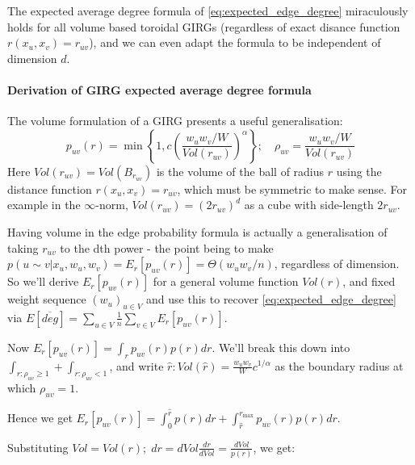 The expected average degree formula of \cref{eq:expected_edge_degree} miraculously holds for all volume based toroidal GIRGs (regardless of exact disance function $r(x_u, x_v) = r_{uv}$), and we can even adapt the formula to be independent of dimension $d$.

\paragraph{Derivation of GIRG expected average degree formula}
The volume formulation of a GIRG presents a useful generalisation:
\begin{equation}
    p_{uv}(r) = \min \left \{ 
        1,
        c \left (
            \frac{w_u w_v / W}{Vol(r_{uv})}
        \right )^\alpha    
    \right \}; \quad \rho_{uv} = \frac{w_u w_v / W}{Vol(r_{uv})}
\end{equation}
Here $Vol(r_{uv}) = Vol(B_{r_{uv}})$ is the volume of the ball of radius $r$ using the distance function $r(x_u, x_v) = r_{uv}$, which must be symmetric to make sense.
For example in the $\infty$-norm, $Vol(r_{uv}) = (2r_{uv})^d$ as a cube with side-length $2r_{uv}$.

Having volume in the edge probability formula is actually a generalisation of taking $r_{uv}$ to the dth power - the point being to make $p(u \sim v | x_u, w_u, w_v) = E_r[p_{uv}(r)] = \Theta(w_u w_v/n)$, regardless of dimension.
So we'll derive $E_r[p_{uv}(r)]$ for a general volume function $Vol(r)$, and fixed weight sequence $(w_u)_{u \in V}$ and use this to recover \cref{eq:expected_edge_degree} via $E[\overline{deg}] = \sum_{u \in V} \frac{1}{n} \sum_{v \in V} E_r[p_{uv}(r)]$.


Now $E_r[p_{uv}(r)] = \int_r p_{uv}(r) p(r) dr$. We'll break this down into $\int_{r: \rho_{uv} \geq 1} + \int_{r: \rho_{uv} < 1}$, and write $\hat{r} : Vol(\hat{r}) = \frac{w_u w_v}{W} c^{1/\alpha}$ as the boundary radius at which $\rho_{uv} = 1$.

Hence we get $E_r[p_{uv}(r)] = \int_0^{\hat{r}} p(r) dr + \int_{\hat{r}}^{r_{\max}} p_{uv}(r) p(r) dr$.

Substituting $Vol = Vol(r);\; dr = dVol \frac{dr}{dVol} = \frac{dVol}{p(r)}$, we get:


